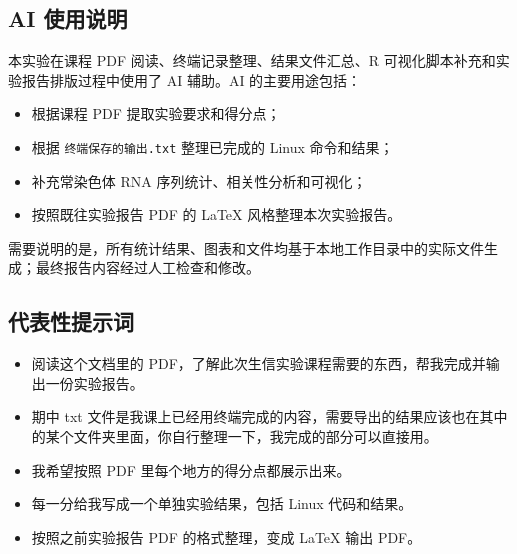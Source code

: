 \documentclass[12pt,a4paper,fontset=fandol]{ctexart}
\begin{document}
\subsection{AI 使用说明}

本实验在课程 PDF 阅读、终端记录整理、结果文件汇总、R 可视化脚本补充和实验报告排版过程中使用了 AI 辅助。AI 的主要用途包括：

\begin{itemize}
  \item 根据课程 PDF 提取实验要求和得分点；
  \item 根据 \texttt{终端保存的输出.txt} 整理已完成的 Linux 命令和结果；
  \item 补充常染色体 RNA 序列统计、相关性分析和可视化；
  \item 按照既往实验报告 PDF 的 LaTeX 风格整理本次实验报告。
\end{itemize}

需要说明的是，所有统计结果、图表和文件均基于本地工作目录中的实际文件生成；最终报告内容经过人工检查和修改。

\subsection{代表性提示词}

\begin{itemize}
  \item 阅读这个文档里的 PDF，了解此次生信实验课程需要的东西，帮我完成并输出一份实验报告。
  \item 期中 txt 文件是我课上已经用终端完成的内容，需要导出的结果应该也在其中的某个文件夹里面，你自行整理一下，我完成的部分可以直接用。
  \item 我希望按照 PDF 里每个地方的得分点都展示出来。
  \item 每一分给我写成一个单独实验结果，包括 Linux 代码和结果。
  \item 按照之前实验报告 PDF 的格式整理，变成 LaTeX 输出 PDF。
\end{itemize}
\end{document}
